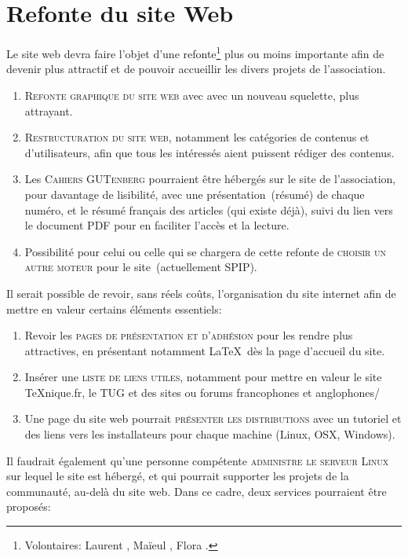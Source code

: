 \documentclass{tufte-handout}
\newcommand{\ratio}[3][]{\marginpar{\footnotesize{\textcolor{teal}{Temps requis: #2 / Utilité: #3}\par\noindent \textcolor{teal}{#1}}}}
\begin{document}
{\section{Refonte du site Web}

Le site web devra faire l'objet d'une refonte\ratio[Travail intense, mais limité dans le temps.]{+++}{+++}\footnote{Volontaires: Laurent , Maïeul , Flora .} plus ou moins importante afin de devenir plus attractif et de pouvoir accueillir les divers projets de l'association.

\begin{enumerate}
	\item\textsc{Refonte graphique du site web} avec avec un nouveau squelette, plus attrayant.
	\item\textsc{Restructuration du site web}, notamment les catégories de contenus et d'utilisateurs, afin que tous les intéressés aient puissent rédiger des contenus.
	\item Les \textsc{Cahiers GUTenberg} pourraient être hébergés sur le site de l'association, pour davantage de lisibilité, avec une présentation~(résumé) de chaque numéro, et le résumé français des articles (qui existe déjà), suivi du lien vers le document PDF pour en faciliter l'accès et la lecture.
	\item Possibilité pour celui ou celle qui se chargera de cette refonte de \textsc{choisir un autre moteur} pour le site~(actuellement SPIP).
\end{enumerate}

Il serait possible de revoir, sans réels coûts\ratio[Travail limité dans le temps]{+}{+++}, l'organisation du site internet afin de mettre en valeur certains éléments essentiels:

\begin{enumerate}
	\item Revoir les \textsc{pages de présentation et d'adhésion} pour les rendre plus attractives, en présentant notamment \LaTeX\ dès la page d'accueil du site.
	\item Insérer une \textsc{liste de liens utiles}, notamment pour mettre en valeur le site \TeX nique.fr, le TUG et des sites ou forums francophones et anglophones/
	\item Une page du site web pourrait \textsc{présenter les distributions} avec un tutoriel et des liens vers les installateurs pour chaque machine (Linux, OSX, Windows).
\end{enumerate}

Il faudrait également qu'une personne compétente\ratio[Compétence très spécifique]{+}{+++} \textsc{administre le serveur Linux} sur lequel le site est hébergé, et qui pourrait supporter les projets de la communauté, au-delà du site web. Dans ce cadre, deux services pourraient être proposés:

}
\end{document}
